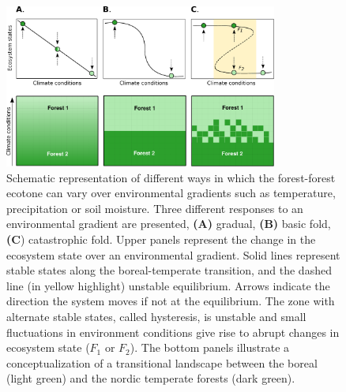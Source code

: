 \begin{figure}[t]
	\begin{center}
	\includegraphics[width=0.8\textwidth]{fig/states.pdf}
	\end{center}
	\caption{Schematic representation of different ways in which the forest-forest ecotone can vary over environmental gradients such as temperature, precipitation
	or soil moisture. Three different responses to an environmental gradient are presented,
	\textbf{(A)} gradual, \textbf{(B)} basic fold, \textbf{(C}) catastrophic fold.
	Upper panels represent the change in the ecosystem state over an environmental gradient. Solid lines represent stable states along the boreal-temperate
	transition, and the dashed line (in yellow highlight) unstable equilibrium. Arrows indicate the
	direction the system moves if not at the equilibrium. The zone with alternate stable states,
	called hysteresis, is unstable and small fluctuations in
	environment conditions give rise to abrupt changes in ecosystem state ($F_1$ or $F_2$). 
	The bottom panels illustrate a conceptualization of a transitional landscape
	between the boreal (light green) and the nordic temperate forests (dark
	green).}
	\label{fig1}
	\vspace{-1.25em}
\end{figure}


